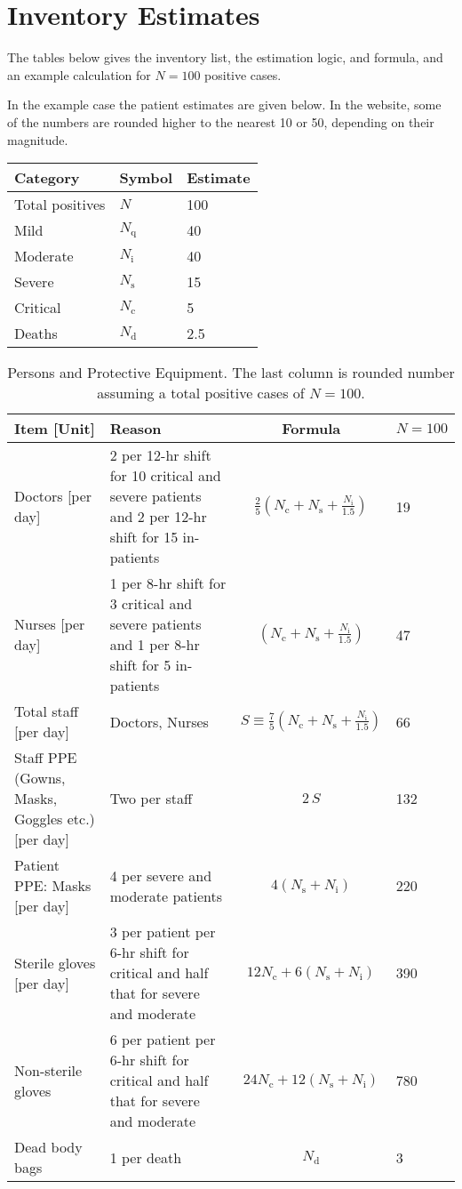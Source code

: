 \documentclass{article}
\newcommand{\nd}{\ensuremath{N_{\mathrm{d}}}}
\newcommand{\nc}{\ensuremath{N_{\mathrm{c}}}}
\newcommand{\ns}{\ensuremath{N_{\mathrm{s}}}}
\newcommand{\nin}{\ensuremath{N_{\mathrm{i}}}}
\newcommand{\nq}{\ensuremath{N_{\mathrm{q}}}}
\begin{document}
\section{Inventory Estimates}
The tables below gives the inventory list, the estimation logic, and
formula, and an example calculation for $N=100$ positive cases.

In the example case the patient estimates are given below. In the
website, some of the numbers are rounded higher to the nearest 10 or
50, depending on their magnitude.

\noindent
\begin{tabular}{lll}
  \toprule
  Category & Symbol & Estimate \\
  \midrule
  Total positives & $N$ & 100 \\
  Mild & $\nq$ & 40 \\
  Moderate & $\nin$ & 40 \\
  Severe & $\ns$ & 15 \\
  Critical & $\nc$ & 5\\
  Deaths & $\nd$ & 2.5\\
  \bottomrule
\end{tabular}


\begin{landscape}
\begin{table}
  \caption{Persons and Protective Equipment. The last column is
    rounded number assuming a total positive cases of $N=100$.}
  \begin{tabularx}{\linewidth}{XXcl}
    \toprule
    Item [Unit] & Reason & Formula & $N=100$ \\
    \midrule
Doctors [per day] & 2 per 12-hr shift for 10 critical and severe
patients and 2 
per 12-hr shift for 15 in-patients &
$\frac{2}{5}\left(\nc+\ns+\frac{\nin}{1.5}\right)$ & 19 \\
Nurses [per day] & 1 per 8-hr shift for 3 critical and severe patients
and 1 per 8-hr shift for 5 in-patients &
$\left(\nc+\ns+\frac{\nin}{1.5}\right)$ & 47\\
Total staff [per day]& Doctors, Nurses &
$S \equiv \frac{7}{5} \left(\nc+\ns+\frac{\nin}{1.5}\right)$ & 66 \\
Staff PPE (Gowns, Masks, Goggles etc.) [per day]&
Two per staff & $2 \, S$  & 132\\
Patient PPE: Masks [per day] & 4 per severe and moderate patients &
$4 (\ns+\nin)$ & 220 \\
Sterile gloves [per day]&
 3 per patient per 6-hr shift for critical and half that for severe and
 moderate &
$12\nc + 6 (\ns+\nin)$ & 390 \\
Non-sterile gloves &
 6 per patient per 6-hr shift for critical and half that for severe and
 moderate &
$24\nc + 12 (\ns+\nin)$ & 780 \\
Dead body bags & 1 per death & $\nd$ & 3 \\
    \bottomrule
  \end{tabularx}
\end{table}
\end{landscape}
\end{document}
